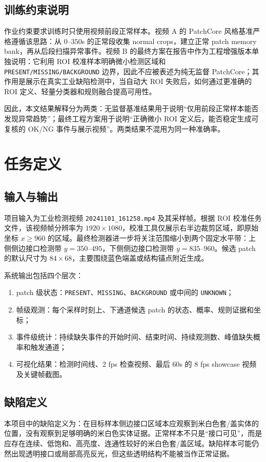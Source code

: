 \documentclass[a4paper,12pt]{article}
\newcommand{\code}[1]{\texttt{#1}}
\begin{document}
\subsection{训练约束说明}
作业约束要求训练时只使用视频前段正常样本。视频 A 的 PatchCore 风格基准严格遵循该思路：从 $0$--$350$s 的正常段收集 normal crops，建立正常 patch memory bank，再从后段扫描异常事件。视频 B 的最终方案在报告中作为工程增强版本单独说明：它利用 ROI 校准样本明确微小检测区域和 \code{PRESENT/MISSING/BACKGROUND} 边界，因此不应被表述为纯无监督 PatchCore；其作用是展示在真实工业缺陷检测中，当自动大 ROI 失败后，如何通过更准确的 ROI 定义、轻量分类器和规则融合提高可用性。

因此，本文结果解释分为两类：无监督基准结果用于说明“仅用前段正常样本能否发现异常趋势”；最终工程方案用于说明“正确微小 ROI 定义后，能否稳定生成可复核的 OK/NG 事件与展示视频”。两类结果不混用为同一种准确率。
\newpage
\section{任务定义}
\subsection{输入与输出}
项目输入为工业检测视频 \code{20241101\_161258.mp4} 及其采样帧。根据 ROI 校准任务文件，该视频帧分辨率为 $1920\times1080$，校准工具仅展示右半边裁剪区域，即原始坐标 $x\geq960$ 的区域。最终检测器进一步将关注范围缩小到两个固定水平带：上侧侧边接口检测带 $y=350$--$495$，下侧侧边接口检测带 $y=835$--$960$。候选 patch 的默认尺寸为 $84\times68$，主要围绕蓝色端盖或结构锚点附近生成。

系统输出包括四个层次：
\begin{enumerate}[label=\arabic*.]
    \item patch 级状态：\code{PRESENT}、\code{MISSING}、\code{BACKGROUND} 或中间的 \code{UNKNOWN}；
    \item 帧级观测：每个采样时刻上、下通道候选 patch 的状态、概率、规则证据和坐标；
    \item 事件级统计：持续缺失事件的开始时间、结束时间、持续观测数、峰值缺失概率和触发通道；
    \item 可视化结果：检测时间线、$2$ fps 检查视频、最后 $60$s 的 $8$ fps showcase 视频及关键帧截图。
\end{enumerate}

\subsection{缺陷定义}
本项目中的缺陷定义为：在目标样本侧边接口区域本应观察到米白色套/盖实体的位置，没有观察到足够明确的米白色实体证据。正常样本不只是“接口可见”，而是应存在连续、低饱和、高亮度、连通性较好的米白色套/盖区域。缺陷样本可能仍然出现透明接口或局部高亮反光，但这些透明结构不能被当作正常证据。
\end{document}
